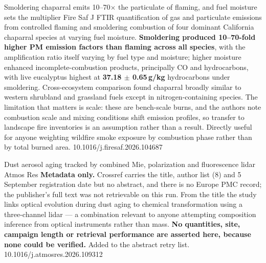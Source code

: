 \documentclass[10pt]{article}
\begin{document}
{Smoldering chaparral emits 10--70$\times$ the particulate of flaming, and fuel moisture
sets the multiplier}
{Fire Saf J}
{FTIR quantification of gas and particulate emissions from controlled flaming and
smoldering combustion of four dominant California chaparral species at varying fuel
moisture. \textbf{Smoldering produced 10--70-fold higher PM emission factors than flaming
across all species}, with the amplification ratio itself varying by fuel type and
moisture; higher moisture enhanced incomplete-combustion products, principally CO and
hydrocarbons, with live eucalyptus highest at
\textbf{37.18 $\pm$ 0.65\,g/kg} hydrocarbons under smoldering. Cross-ecosystem comparison
found chaparral broadly similar to western shrubland and grassland fuels except in
nitrogen-containing species. The limitation that matters is scale: these are
bench-scale burns, and the authors note combustion scale and mixing conditions shift
emission profiles, so transfer to landscape fire inventories is an assumption rather than
a result. Directly useful for anyone weighting wildfire smoke exposure by combustion
phase rather than by total burned area.}
{10.1016/j.firesaf.2026.104687}

{Dust aerosol aging tracked by combined Mie, polarization and fluorescence lidar}
{Atmos Res}
{\textbf{Metadata only.} Crossref carries the title, author list (8) and 5 September
registration date but no abstract, and there is no Europe PMC record; the publisher's
full text was not retrievable on this run. From the title the study links optical
evolution during dust aging to chemical transformation using a three-channel lidar ---
a combination relevant to anyone attempting composition inference from optical
instruments rather than mass. \textbf{No quantities, site, campaign length or retrieval
performance are asserted here, because none could be verified.} Added to the abstract
retry list.}
{10.1016/j.atmosres.2026.109312}

\end{document}
